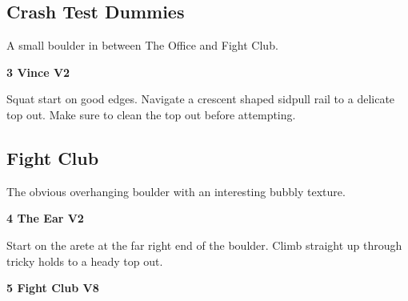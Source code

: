 \begin{multicols}{2}
			\subsection*{Crash Test Dummies}\label{bf:Crash Test Dummies}
			\begin{minipage}{\columnwidth}
			A small boulder in between The Office and Fight Club.
			\end{minipage}
			
					\begin{minipage}{\linewidth}	
					\label{rt:Vince}
\colorbox{green!20}{
\parbox{0.95\textwidth}{
\textbf{
3 Vince V2    
}
}
}

					\begin{adjustwidth}{0.5cm}{}				
					Squat start on good edges. Navigate a crescent shaped sidpull rail to a delicate top out. Make sure to clean the top out before attempting.
					\end{adjustwidth}
					\end{minipage}
			\subsection*{Fight Club}\label{bf:Fight Club}
			\begin{minipage}{\columnwidth}
			The obvious overhanging boulder with an interesting bubbly texture.
			\end{minipage}
			
\label{pt:Fight Club}
					\begin{minipage}{\linewidth}	
					\label{rt:The Ear}
\colorbox{green!20}{
\parbox{0.95\textwidth}{
\textbf{
4 The Ear V2     
}
}
}

					\begin{adjustwidth}{0.5cm}{}				
					Start on the arete at the far right end of the boulder. Climb straight up through tricky holds to a heady top out.
					\end{adjustwidth}
					\end{minipage}


					\begin{minipage}{\linewidth}	
					\label{rt:Fight Club}
\colorbox{Goldenrod!50}{
\parbox{0.95\textwidth}{
\textbf{
5 Fight Club V8     
}
}
}


\end{minipage}
\end{multicols}
